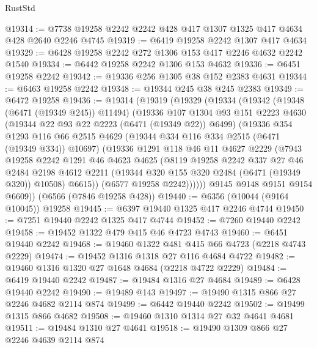 \begin{lexlean}{RustStd}
\begin{coremodule}
{\begin{coremodule}
{{{{{{{{{{{{{{{{{{{{{{{{{{@19314 := @7738 @19258 @2242 @2242 @428 @417 @1307 @1325 @417 @4634 @428 @2640 @2246 @4745
@19319 := @6419 @19258 @2242 @1307 @417 @4634
@19329 := @6428 @19258 @2242 @272 @1306 @153 @417 @2246 @4632 @2242 @1540
@19334 := @6442 @19258 @2242 @1306 @153 @4632
@19336 := @6451 @19258 @2242
@19342 := @19336 @256 @1305 @38 @152 @2383 @4631
@19344 := @6463 @19258 @2242
@19348 := @19344 @245 @38 @245 @2383
@19349 := @6472 @19258
@19436 := @19314
    (@19319
      (@19329
        (@19334
          (@19342
            (@19348 (@6471 (@19349 @245)) @11494)
            (@19336
              @107
              @1304
              @93
              @151
              @2223
              @4630
              (@19344 @22 @93 @22 @2223 (@6471 (@19349 @22)) @6499)
              (@19336
                @354
                @1293
                @116
                @66
                @2515
                @4629
                (@19344 @334 @116 @334 @2515 (@6471 (@19349 @334)) @10697)
                (@19336
                  @1291
                  @118
                  @46
                  @11
                  @4627
                  @2229
                  (@7943
                    @19258
                    @2242
                    @1291
                    @46
                    @4623
                    @4625
                    (@8119
                      @19258
                      @2242
                      @337
                      @27
                      @46
                      @2484
                      @2198
                      @4612
                      @2211
                      (@19344 @320 @155 @320 @2484 (@6471 (@19349 @320)) @10508)
                      @6615))
                  (@6577 @19258 @2242))))))
        @9145
        @9148
        @9151
        @9154
        @6609))
    (@6566 (@7846 @19258 @428))
@19440 := @6356 (@10044 (@9164 @10045)) @19258
@19445 := @6397 @19440 @1325 @417 @2246 @4744
@19450 := @7251 @19440 @2242 @1325 @417 @4744
@19452 := @7260 @19440 @2242
@19458 := @19452 @1322 @479 @415 @46 @4723 @4743
@19460 := @6451 @19440 @2242
@19468 := @19460 @1322 @481 @415 @66 @4723 (@2218 @4743 @2229)
@19474 := @19452 @1316 @1318 @27 @116 @4684 @4722
@19482 := @19460 @1316 @1320 @27 @1648 @4684 (@2218 @4722 @2229)
@19484 := @6419 @19440 @2242
@19487 := @19484 @1316 @27 @4684
@19489 := @6428 @19440 @2242
@19490 := @19489 @143
@19497 := @19490 @1315 @866 @27 @2246 @4682 @2114 @874
@19499 := @6442 @19440 @2242
@19502 := @19499 @1315 @866 @4682
@19508 := @19460 @1310 @1314 @27 @32 @4641 @4681
@19511 := @19484 @1310 @27 @4641
@19518 := @19490 @1309 @866 @27 @2246 @4639 @2114 @874
}}}}}}}}}}}}}}}}}}}}}}}}}}
\end{coremodule}}
\end{coremodule}
\end{lexlean}
